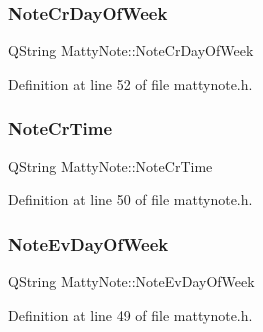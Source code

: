 \hypertarget{classMattyNote_a3776d088e67ef0181116b1cc2db3fd94}{}\label{classMattyNote_a3776d088e67ef0181116b1cc2db3fd94} 
\subsubsection{\texorpdfstring{Note\+Cr\+Day\+Of\+Week}{NoteCrDayOfWeek}}
{\footnotesize\ttfamily Q\+String Matty\+Note\+::\+Note\+Cr\+Day\+Of\+Week\hspace{0.3cm}{\ttfamily [private]}}



Definition at line 52 of file mattynote.\+h.

\hypertarget{classMattyNote_a03208145949dfb98a99cfd9d95373418}{}\label{classMattyNote_a03208145949dfb98a99cfd9d95373418} 
\subsubsection{\texorpdfstring{Note\+Cr\+Time}{NoteCrTime}}
{\footnotesize\ttfamily Q\+String Matty\+Note\+::\+Note\+Cr\+Time\hspace{0.3cm}{\ttfamily [private]}}



Definition at line 50 of file mattynote.\+h.

\hypertarget{classMattyNote_a1182beac3edac3a7a7e4cdce72fc02ce}{}\label{classMattyNote_a1182beac3edac3a7a7e4cdce72fc02ce} 
\subsubsection{\texorpdfstring{Note\+Ev\+Day\+Of\+Week}{NoteEvDayOfWeek}}
{\footnotesize\ttfamily Q\+String Matty\+Note\+::\+Note\+Ev\+Day\+Of\+Week\hspace{0.3cm}{\ttfamily [private]}}



Definition at line 49 of file mattynote.\+h.

\hypertarget{classMattyNote_a9644cd6552e27c1875d83edce2469db3}{}\label{classMattyNote_a9644cd6552e27c1875d83edce2469db3} 
